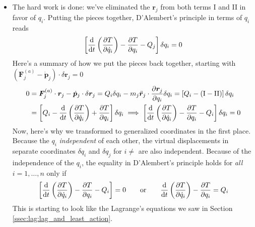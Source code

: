 \documentclass[11pt, a4paper]{article}
\newcommand{\eqtext}[1]{\qquad \text{#1} \qquad}
\newcommand{\bdot}[1]{\dot{\bm{#1}}} %
\newcommand{\bddot}[1]{\ddot{\bm{#1}}} %
\begin{document}
\begin{itemize}
	\item The hard work is done: we've eliminated the $ \bm{r}_{j} $ from both terms I and II in favor of $ q_{i} $. Putting the pieces together, D'Alembert's principle in terms of $ q_{i} $ reads
	\begin{equation*}
		\left[\dv{}{t} \left(\pdv{T}{\dot{q}_{i}}\right) - \pdv{T}{q_{i}} - Q_{j}\right]\delta q_{i} = 0
	\end{equation*}
	Here's a summary of how we put the pieces back together, starting with $ \left(\bm{F}_{j}^{(a)} - \bdot{p}_{j}\right)\cdot \delta \bm{r}_{j} = 0 $
	\begin{align*}
		0 &=\bm{F}_{j}^{(a)}\cdot \bm{r}_{j} - \bdot{p}_{j}\cdot \delta \bm{r}_{j} =  Q_{i}\delta q_{i} - m_{j}  \bddot{r}_{j} \cdot \pdv{\bm{r}_{j}}{q_{i}} \delta q_{i} = \left[Q_{i} - (\mathrm{I} - \mathrm{II})\right] \delta q_{i}\\
		&= \left[Q_{i} - \dv{}{t}\left(\pdv{T}{\dot{q}_{i}}\right) +  \pdv{T}{q_{i}} \right] \delta q_{i} \implies \left[\dv{}{t} \left(\pdv{T}{\dot{q}_{i}}\right) - \pdv{T}{q_{i}} - Q_{i}\right]\delta q_{i} = 0
	\end{align*}
	Now, here's why we transformed to generalized coordinates in the first place. Because the $ q_{i} $ \textit{independent} of each other, the virtual displacements in separate coordinates $ \delta q_{i} $ and $ \delta q_{j} $ for $ i \neq $ are also independent. Because of the independence of the $ q_{i} $, the equality in D'Alembert's principle holds for \textit{all} $ i = 1, \ldots, n $ only if
	\begin{equation*}
		\left[\dv{}{t} \left(\pdv{T}{\dot{q}_{i}}\right) - \pdv{T}{q_{i}} - Q_{i}\right] = 0 \eqtext{or} \dv{}{t} \left(\pdv{T}{\dot{q}_{i}}\right) - \pdv{T}{q_{i}} = Q_{i}
	\end{equation*}
	This is starting to look like the Lagrange's equations we saw in Section \ref{ssec:lag:lag_and_least_action}.

\end{itemize}
\end{document}
